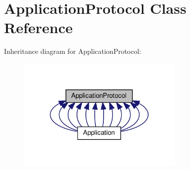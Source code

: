 \hypertarget{classApplicationProtocol}{}\section{Application\+Protocol Class Reference}
\label{classApplicationProtocol}


Inheritance diagram for Application\+Protocol\+:
\nopagebreak
\begin{figure}[H]
\begin{center}
\leavevmode
\includegraphics[width=229pt]{classApplicationProtocol__inherit__graph}
\end{center}
\end{figure}
